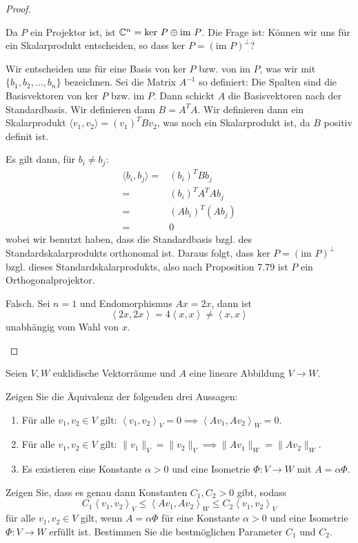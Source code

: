 \begin{proof}
	\begin{parts}
	\item Da $P$ ein Projektor ist, ist $\mathbb{C}^n=\text{ker }P\oplus \text{im }P$. Die Frage ist: Können wir uns für ein Skalarprodukt entscheiden, so dass  $\text{ker }P=(\text{im }P)^\perp$? 
		
		Wir entscheiden uns für eine Basis von $\text{ker }P$ bzw. von $\text{im }P$, was wir mit $\{b_1,b_2,\dots, b_n\} $ bezeichnen. Sei die Matrix $A^{-1}$ so definiert: Die Spalten sind die Basisvektoren von $\text{ker }P$ bzw. $\text{im }P$. Dann schickt $A$ die Basisvektoren nach der Standardbasis. Wir definieren dann $B=A^TA$. Wir definieren dann ein Skalarprodukt $\langle v_1, v_2\rangle = (v_1)^TBv_2$, was noch ein Skalarprodukt ist, da $B$ positiv definit ist. 

		Es gilt dann, f\"{u}r $b_i\neq b_j$:
		\begin{align*}
			\langle b_i, b_j\rangle=& (b_i)^TBb_j\\
			=&(b_i)^TA^TAb_j\\
			=&(Ab_i)^T(Ab_j)\\
			=&0
		\end{align*}
		wobei wir benutzt haben, dass die Standardbasis bzgl. des Standardskalarprodukts orthonomal ist. Daraus folgt, dass $\text{ker }P=(\text{im }P)^\perp$ bzgl. dieses Standardskalarprodukts, also nach Proposition 7.79 ist $P$ ein Orthogonalprojektor.
	\item Falsch. Sei $n=1$ und Endomorphismus $Ax=2x$, dann ist
		\[
		\left<2x, 2x \right> = 4\left<x,x \right>\neq \left<x,x \right>
	\]
	unabhängig vom Wahl von $x$.
	\end{parts}
\end{proof}
\begin{Problem}
	Seien $V,W$ euklidische Vektorräume und $A$ eine lineare Abbildung $V\to W$. 
	\begin{parts}
	\item Zeigen Sie die Äquivalenz der folgenden drei Aussagen:
		\begin{enumerate}[label=\roman*.]
			\item F\"{u}r alle $v_1,v_2\in V$ gilt: $\left<v_1,v_2 \right>_V=0\implies \left<Av_1, Av_2 \right>_W=0$.
			\item F\"{u}r alle $v_1,v_2\in V$ gilt: $\|v_1\|_V=\|v_2\|_V\implies \|Av_1\|_W=\|Av_2\|_W$.
			\item Es existieren eine Konstante $\alpha>0$ und eine Isometrie $\Phi:V\to W$ mit $A=\alpha\Phi$.
		\end{enumerate}
	\item Zeigen Sie, dass es genau dann Konstanten $C_1,C_2>0$ gibt, sodass
		\[
		C_1\left<v_1,v_2 \right>_V\le \left<Av_1,Av_2 \right>_W\le C_2\left<v_1,v_2 \right>_V
	\]
	f\"{u}r alle $v_1,v_2\in V$ gilt, wenn $A=\alpha\Phi$ f\"{u}r eine Konstante $\alpha>0$ und eine Isometrie $\Phi:V\to W$ erf\"{u}llt ist. Bestimmen Sie die bestmöglichen Parameter $C_1$ und $C_2$.
	\end{parts}
\end{Problem}
